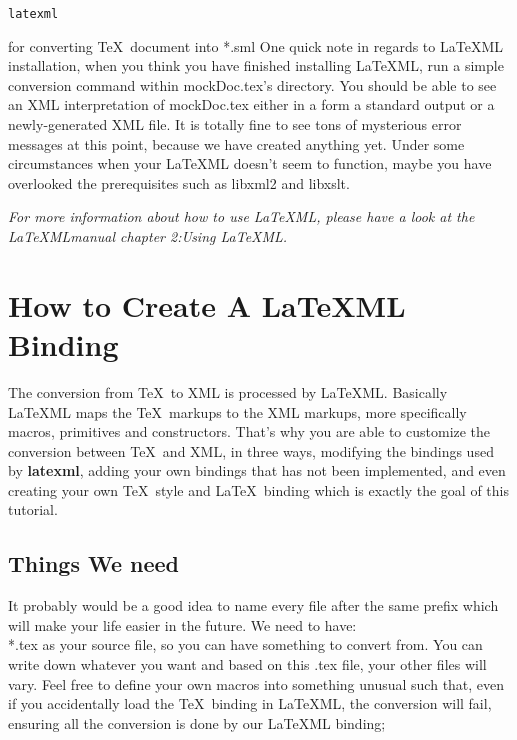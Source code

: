 \documentclass{book}
\begin{document}
\begin{lstlisting}
latexml
\end{lstlisting}

 for converting \TeX \ document into *.sml 
One quick note in regards to \LaTeX ML installation, when you think you have finished installing \LaTeX ML, run
a simple conversion command within mockDoc.tex's directory. You should be able to see an XML interpretation of
mockDoc.tex either in a form a standard output or a newly-generated XML file. It is totally fine to see tons of mysterious 
error messages at this point, because we have created anything yet. Under some circumstances when your \LaTeX ML doesn't seem
to function, maybe you have overlooked the prerequisites such as libxml2 and libxslt. \\

\begin{tcolorbox}
\emph{For more information about how to use \LaTeX ML, please have a look at the \LaTeX MLmanual chapter 2:Using \LaTeX ML.}
\end{tcolorbox}

\section{How to Create A LaTeXML Binding}
The conversion from \TeX\  to XML is processed by \LaTeX ML. Basically \LaTeX ML maps the \TeX \ markups to
the XML markups, more specifically macros, primitives and constructors. That's why you are able to customize the conversion 
between \TeX\  and XML, in three ways, modifying the bindings used by \textbf{latexml}, adding your own bindings that has not been
implemented, and even creating your own \TeX \ style and \LaTeX\  binding which is exactly the goal of this tutorial.
\subsection{Things We need}
It probably would be a good idea to name every file after the same prefix which will make your life easier in the future. We need to have:\\ 

*.tex  as your source file, so you can have something to convert from. You can write down whatever you want and based on 
this .tex file, your other files will vary. Feel free to define your own macros into something unusual such that, even if you accidentally load the
\TeX\ binding in \LaTeX ML, the conversion will fail, ensuring all the conversion is done by our \LaTeX ML binding; \\ \\
\end{document}
